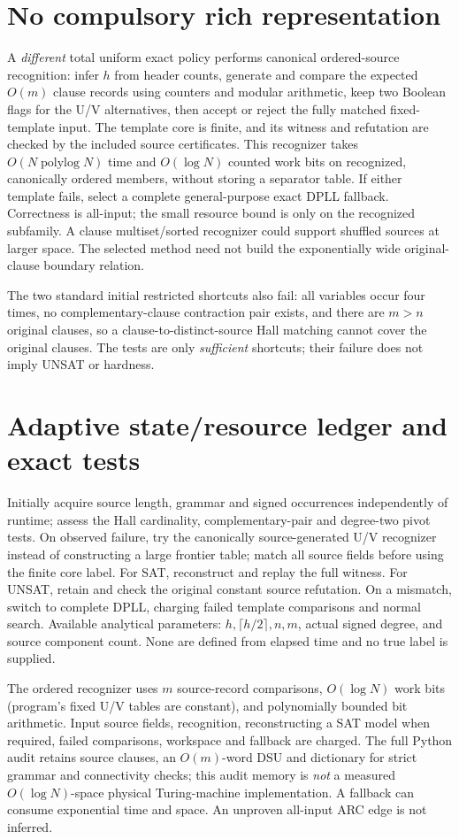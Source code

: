 \documentclass[11pt]{article}
\begin{document}
\section{No compulsory rich representation}
A \emph{different} total uniform exact policy performs canonical ordered-source recognition: infer \(h\) from header counts, generate and compare the expected \(O(m)\) clause records using counters and modular arithmetic, keep two Boolean flags for the U/V alternatives, then accept or reject the fully matched fixed-template input. The template core is finite, and its witness and refutation are checked by the included source certificates. This recognizer takes \(O(N\operatorname{polylog}N)\) time and \(O(\log N)\) counted work bits on recognized, canonically ordered members, without storing a separator table. If either template fails, select a complete general-purpose exact DPLL fallback. Correctness is all-input; the small resource bound is only on the recognized subfamily. A clause multiset/sorted recognizer could support shuffled sources at larger space. The selected method need not build the exponentially wide original-clause boundary relation.

The two standard initial restricted shortcuts also fail: all variables occur four times, no complementary-clause contraction pair exists, and there are \(m>n\) original clauses, so a clause-to-distinct-source Hall matching cannot cover the original clauses. The tests are only \emph{sufficient} shortcuts; their failure does not imply UNSAT or hardness.

\section{Adaptive state/resource ledger and exact tests}
Initially acquire source length, grammar and signed occurrences independently of runtime; assess the Hall cardinality, complementary-pair and degree-two pivot tests. On observed failure, try the canonically source-generated U/V recognizer instead of constructing a large frontier table; match all source fields before using the finite core label. For SAT, reconstruct and replay the full witness. For UNSAT, retain and check the original constant source refutation. On a mismatch, switch to complete DPLL, charging failed template comparisons and normal search. Available analytical parameters: \(h,\lceil h/2\rceil,n,m\), actual signed degree, and source component count. None are defined from elapsed time and no true label is supplied.

The ordered recognizer uses \(m\) source-record comparisons, \(O(\log N)\) work bits (program's fixed U/V tables are constant), and polynomially bounded bit arithmetic. Input source fields, recognition, reconstructing a SAT model when required, failed comparisons, workspace and fallback are charged. The full Python audit retains source clauses, an \(O(m)\)-word DSU and dictionary for strict grammar and connectivity checks; this audit memory is \emph{not} a measured \(O(\log N)\)-space physical Turing-machine implementation. A fallback can consume exponential time and space. An unproven all-input ARC edge is not inferred.
\end{document}
